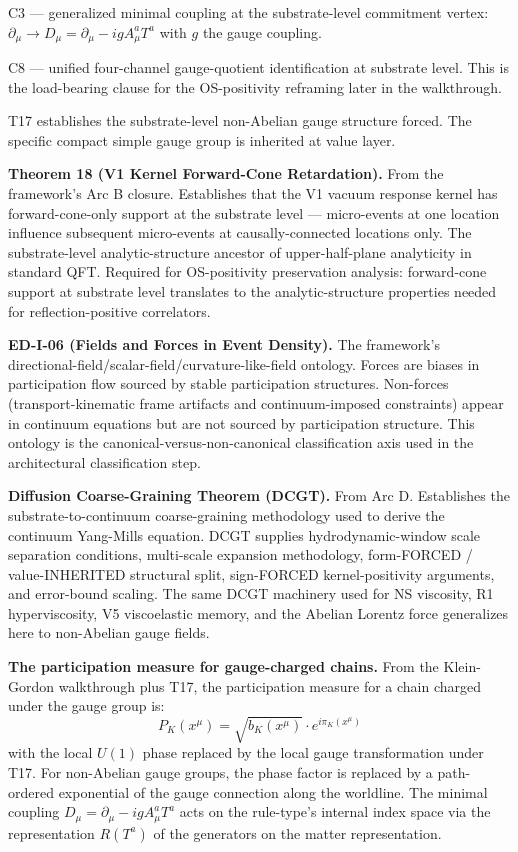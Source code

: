 \documentclass[11pt,a4paper]{article}
\begin{document}
C3 --- generalized minimal coupling at the substrate-level commitment vertex: $\partial_\mu \to D_\mu = \partial_\mu - ig A_\mu^a T^a$ with $g$ the gauge coupling.

C8 --- unified four-channel gauge-quotient identification at substrate level. This is the load-bearing clause for the OS-positivity reframing later in the walkthrough.

T17 establishes the substrate-level non-Abelian gauge structure forced. The specific compact simple gauge group is inherited at value layer.

\textbf{Theorem 18 (V1 Kernel Forward-Cone Retardation).} From the framework's Arc B closure. Establishes that the V1 vacuum response kernel has forward-cone-only support at the substrate level --- micro-events at one location influence subsequent micro-events at causally-connected locations only. The substrate-level analytic-structure ancestor of upper-half-plane analyticity in standard QFT. Required for OS-positivity preservation analysis: forward-cone support at substrate level translates to the analytic-structure properties needed for reflection-positive correlators.

\textbf{ED-I-06 (Fields and Forces in Event Density).} The framework's directional-field/scalar-field/curvature-like-field ontology. Forces are biases in participation flow sourced by stable participation structures. Non-forces (transport-kinematic frame artifacts and continuum-imposed constraints) appear in continuum equations but are not sourced by participation structure. This ontology is the canonical-versus-non-canonical classification axis used in the architectural classification step.

\textbf{Diffusion Coarse-Graining Theorem (DCGT).} From Arc D. Establishes the substrate-to-continuum coarse-graining methodology used to derive the continuum Yang-Mills equation. DCGT supplies hydrodynamic-window scale separation conditions, multi-scale expansion methodology, form-FORCED / value-INHERITED structural split, sign-FORCED kernel-positivity arguments, and error-bound scaling. The same DCGT machinery used for NS viscosity, R1 hyperviscosity, V5 viscoelastic memory, and the Abelian Lorentz force generalizes here to non-Abelian gauge fields.

\textbf{The participation measure for gauge-charged chains.} From the Klein-Gordon walkthrough plus T17, the participation measure for a chain charged under the gauge group is:
\[
P_K(x^\mu) = \sqrt{b_K(x^\mu)} \cdot e^{i\pi_K(x^\mu)}
\]
with the local $U(1)$ phase replaced by the local gauge transformation under T17. For non-Abelian gauge groups, the phase factor is replaced by a path-ordered exponential of the gauge connection along the worldline. The minimal coupling $D_\mu = \partial_\mu - ig A_\mu^a T^a$ acts on the rule-type's internal index space via the representation $R(T^a)$ of the generators on the matter representation.
\end{document}
